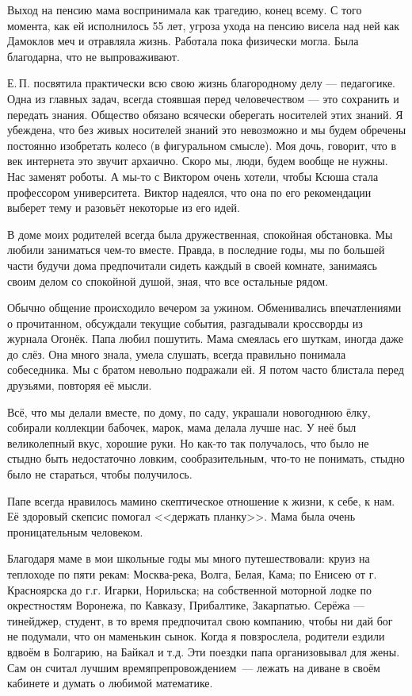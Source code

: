Выход на пенсию мама воспринимала как трагедию, конец всему. С того момента, как ей исполнилось 55 лет, угроза ухода на пенсию висела над ней как Дамоклов меч и отравляла жизнь. Работала пока физически могла. Была благодарна, что не выпроваживают.

Е.\,П. посвятила практически всю свою жизнь благородному делу --- педагогике. Одна из главных задач, всегда стоявшая перед человечеством --- это сохранить и передать знания. Общество обязано всячески оберегать носителей этих знаний. Я убеждена, что без живых носителей знаний это невозможно и мы будем обречены постоянно изобретать колесо (в фигуральном смысле). Моя дочь, говорит, что в век интернета это звучит архаично. Скоро мы, люди, будем вообще не нужны. Нас заменят роботы. А мы-то с Виктором очень хотели, чтобы Ксюша стала профессором университета. Виктор надеялся, что она по его рекомендации выберет тему и разовьёт некоторые из его идей.

В доме моих родителей всегда была дружественная, спокойная обстановка. Мы любили заниматься чем-то вместе. Правда, в последние годы, мы по большей части будучи дома предпочитали сидеть каждый в своей комнате, занимаясь своим делом со спокойной душой, зная, что все остальные рядом.

Обычно общение происходило вечером за ужином. Обменивались впечатлениями о прочитанном, обсуждали текущие события, разгадывали кроссворды из журнала Огонёк. Папа любил пошутить. Мама  смеялась его шуткам,  иногда даже до слёз. Она много знала, умела слушать, всегда правильно понимала собеседника. Мы с братом невольно подражали ей. Я потом часто блистала перед друзьями, повторяя её мысли.

Всё, что мы делали вместе, по дому, по саду, украшали новогоднюю ёлку, собирали коллекции бабочек, марок, мама делала лучше нас. У неё был великолепный вкус, хорошие руки. Но как-то так получалось, что было не стыдно быть недостаточно ловким, сообразительным, что-то не понимать, стыдно было не стараться, чтобы получилось.

Папе всегда нравилось мамино скептическое отношение к жизни, к себе, к нам. Её здоровый скепсис помогал <<держать планку>>. Мама была очень проницательным человеком.

Благодаря маме в мои школьные годы мы много путешествовали:
круиз на теплоходе по пяти рекам: Москва-река, Волга, Белая, Кама;
по Енисею от г. Красноярска до г.г. Игарки, Норильска;
на собственной моторной лодке по окрестностям Воронежа, по Кавказу, Прибалтике, Закарпатью.
Серёжа --- тинейджер, студент, в то время предпочитал свою компанию, чтобы ни дай бог не подумали, что он маменькин сынок.
Когда я повзрослела, родители ездили вдвоём в Болгарию, на Байкал и т.д.
Эти поездки папа организовывал для жены.
Сам он считал лучшим вре\-мя\-пре\-п\-ро\-во\-ж\-де\-ни\-ем~--- лежать на диване в своём кабинете и думать о любимой математике.

